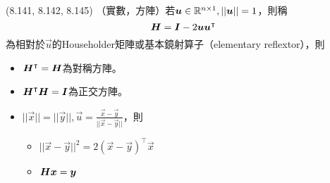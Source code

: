 \item \begin{theorem}{(8.141, 8.142, 8.145)} （實數，方陣）若$\boldsymbol{u} \in \mathbb{R}^{n \times 1}, ||\boldsymbol{u}|| = 1$，則稱
	\begin{equation}
		\boldsymbol{H} = \boldsymbol{I} - 2\boldsymbol{uu}^\intercal
	\end{equation}
	為相對於$\vec{u}$的Householder矩陣或基本鏡射算子（elementary reflextor），則
	\begin{itemize}
		\item $\boldsymbol{H}^\intercal = \boldsymbol{H}$為對稱方陣。
		\item $\boldsymbol{H}^\intercal\boldsymbol{H} = \boldsymbol{I}$為正交方陣。
		\item $||\vec{x}|| = ||\vec{y}||, \vec{u} = \frac{\vec{x} - \vec{y}}{||\vec{x} - \vec{y}||}$，則
		\begin{itemize}
			\item $||\vec{x} - \vec{y}||^2 = 2(\vec{x} - \vec{y})^\intercal\vec{x}$
			\item $\boldsymbol{H}\boldsymbol{x} = \boldsymbol{y}$
		\end{itemize}
	\end{itemize}
\end{theorem}

